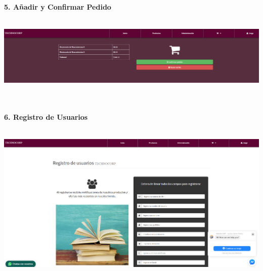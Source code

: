 \begin{flushleft}
\begin{itemize}
\textbf{ }\\
\textbf{ }\\

\textbf{ }\\
\textbf{ }\\

\textbf{ }\\
\textbf{ }\\

\textbf{ }\\
\textbf{ }\\
\textbf{5. Añadir y Confirmar Pedido }\\
\textbf{ }\\
\begin{center}
	\includegraphics[width=18cm]{./Imagenes/front3} 
\end{center}
\textbf{ }\\
\textbf{ }\\
\textbf{6. Registro de Usuarios }\\
\textbf{ }\\
\begin{center}
	\includegraphics[width=18cm]{./Imagenes/front4} 
\end{center}


\end{itemize}
\end{flushleft}
